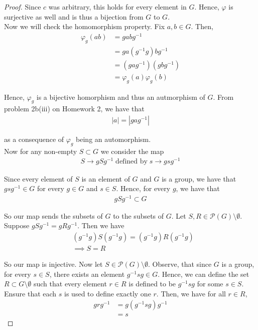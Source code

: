 \documentclass[11pt, reqno]{amsart}
\theoremstyle{plain}
\theoremstyle{definition}
\theoremstyle{example}
\begin{document}
\begin{enumerate}[1.]
\begin{enumerate}[(a)]
\begin{proof}
Since $c$ was arbitrary, this holds for every element in $G$. Hence, $\varphi$ is surjective as well and is thus a bijection from $G$ to $G$.\\

Now we will check the homomorphism property. Fix $a, b \in G$. Then,
\begin{align*}
\varphi_g(ab) &= gabg^{-1}\\
&= ga(g^{-1}g)bg^{-1}\\
&= (gag^{-1})(gbg^{-1})\\
&= \varphi_g(a)\varphi_g(b)
\end{align*}

Hence, $\varphi_g$ is a bijective homorphism and thus an autmorphism of $G$. From problem 2b(iii) on Homework 2, we have that 
\begin{align*}
|a| = |gag^{-1}|
\end{align*}

as a consequence of $\varphi_g$ being an automorphism.\\

Now for any non-empty $S \subset G$ we consider the map
\begin{align*}
S \to gSg^{-1} \; \text{defined by} \; s \to gsg^{-1}
\end{align*}

Since every element of $S$ is an element of $G$ and $G$ is a group, we have that $gsg^{-1} \in G$ for every $g \in G$ and $s \in S$. Hence, for every $g$, we have that
\begin{align*}
gSg^{-1} \subset G
\end{align*}

So our map sends the subsets of $G$ to the subsets of $G$. Let $S, R \in \mathcal{P}(G) \setminus \emptyset$. Suppose $gSg^{-1} = gRg^{-1}$. Then we have
\begin{align*}
&(g^{-1}g)S(g^{-1}g) = (g^{-1}g)R(g^{-1}g)\\
&\implies S = R
\end{align*}

So our map is injective. Now let $S \in \mathcal{P}(G) \setminus \emptyset$. Observe, that since $G$ is a group, for every $s \in S$, there exists an element $g^{-1}sg \in G$. Hence, we can define the set $R \subset G \setminus \emptyset$ such that every element $r \in R$ is defined to be $g^{-1}sg$ for some $s \in S$. Ensure that each $s$ is used to define exactly one $r$. Then, we have for all $r \in R$,
\begin{align*}
grg^{-1} &= g(g^{-1}sg)g^{-1}\\
&= s
\end{align*}


\end{proof}
\end{enumerate}
\end{enumerate}
\end{document}
